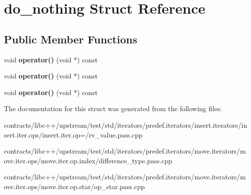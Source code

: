\hypertarget{structdo__nothing}{}\section{do\+\_\+nothing Struct Reference}
\label{structdo__nothing}
\subsection*{Public Member Functions}
\begin{DoxyCompactItemize}
\item 
\mbox{\label{structdo__nothing_a7ccc7c50b6470902a75073674aee969d}} 
void {\bfseries operator()} (void $\ast$) const
\item 
\mbox{\label{structdo__nothing_a7ccc7c50b6470902a75073674aee969d}} 
void {\bfseries operator()} (void $\ast$) const
\item 
\mbox{\label{structdo__nothing_a7ccc7c50b6470902a75073674aee969d}} 
void {\bfseries operator()} (void $\ast$) const
\end{DoxyCompactItemize}


The documentation for this struct was generated from the following files\+:\begin{DoxyCompactItemize}
\item 
contracts/libc++/upstream/test/std/iterators/predef.\+iterators/insert.\+iterators/insert.\+iter.\+ops/insert.\+iter.\+op=/rv\+\_\+value.\+pass.\+cpp\item 
contracts/libc++/upstream/test/std/iterators/predef.\+iterators/move.\+iterators/move.\+iter.\+ops/move.\+iter.\+op.\+index/difference\+\_\+type.\+pass.\+cpp\item 
contracts/libc++/upstream/test/std/iterators/predef.\+iterators/move.\+iterators/move.\+iter.\+ops/move.\+iter.\+op.\+star/op\+\_\+star.\+pass.\+cpp\end{DoxyCompactItemize}
